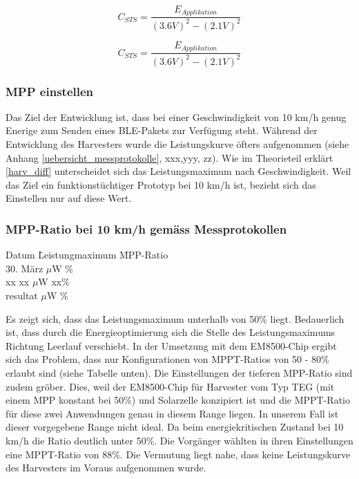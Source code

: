\begin{equation}
  C_{STS}= \frac{ E_{Applikation}}{(3.6 V )^2 - (2.1 V)^2}
\end{equation}

\begin{equation}
  C_{STS}= \frac{ E_{Applikation}}{(3.6 V )^2 - (2.1 V)^2}
\end{equation}



\subsubsection{MPP einstellen}


Das Ziel der Entwicklung ist, dass bei einer Geschwindigkeit von 10 km/h genug Enerige zum Senden eines BLE-Pakets zur Verfügung steht. Während der Entwicklung des Harvesters wurde die Leistungskurve öfters aufgenommen (siehe Anhang \ref{uebersicht_messprotokolle}, xxx,yyy, zz). Wie im Theorieteil erklärt \ref{harv_diff} unterscheidet sich das Leistungsmaximum nach Geschwindigkeit. Weil das Ziel ein funktionstüchtiger Prototyp bei 10 km/h ist, bezieht sich das Einstellen nur auf diese Wert.  

 
\subsubsection*{MPP-Ratio bei 10 km/h gemäss Messprotokollen}
\begin{tabbing}
    Datum       \quad\= Leistungmaximum    \quad\= MPP-Ratio\\[0.8ex]
    30. März     $\mu$W        \thinspace\% \\
    xx          \> xx $\mu$W        \> xx\thinspace\%\\
    resultat      $\mu$W    \thinspace\%\\
\end{tabbing}

Es zeigt sich, dass das Leistungsmaximum unterhalb von 50\thinspace\% liegt. Bedauerlich ist, dass durch die Energieoptimierung sich die Stelle des Leistungsmaximums Richtung Leerlauf verschiebt. In der Umsetzung mit dem EM8500-Chip ergibt sich das Problem, dass nur Konfigurationen von MPPT-Ratios von 50 - 80\thinspace\% erlaubt sind (siehe Tabelle unten).  Die Einstellungen der tieferen MPP-Ratio sind zudem gröber. Dies, weil der EM8500-Chip für Harvester vom Typ TEG (mit einem MPP konstant bei 50\thinspace\%) und Solarzelle konzipiert ist und die MPPT-Ratio für diese zwei Anwendungen genau in diesem Range liegen. In unserem Fall ist dieser vorgegebene Range nicht ideal. Da beim energiekritischen Zustand bei 10 km/h die Ratio deutlich unter 50\thinspace\%. Die Vorgänger wählten in ihren Einstellungen eine MPPT-Ratio von 88\thinspace\%. Die Vermutung liegt nahe, dass keine Leistungskurve des Harvesters im Voraus aufgenommen wurde.


